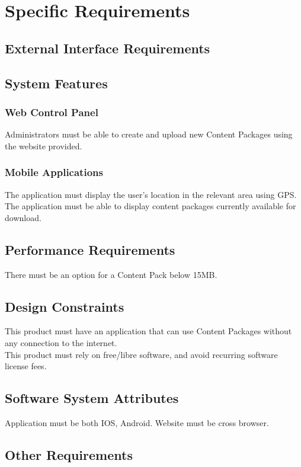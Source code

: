 \documentclass[letterpaper,10pt,titlepage]{article}
\begin{document}
\section{Specific Requirements}
\subsection{External Interface Requirements}
\subsection{System Features}
\subsubsection{Web Control Panel}
Administrators must be able to create and upload new Content Packages using the website provided.
\subsubsection{Mobile Applications}
The application must display the user's location in the relevant area using GPS.\\
The application must be able to display content packages currently available for download.

\subsection{Performance Requirements}
There must be an option for a Content Pack below 15MB. 

\subsection{Design Constraints}
This product must have an application that can use Content Packages without any connection to the internet.\\
This product must rely on free/libre software, and avoid recurring software license fees.

\subsection{Software System Attributes}
Application must be both IOS, Android. Website must be cross browser.

\subsection{Other Requirements}
\vspace{0.5cm}
\end{document}
